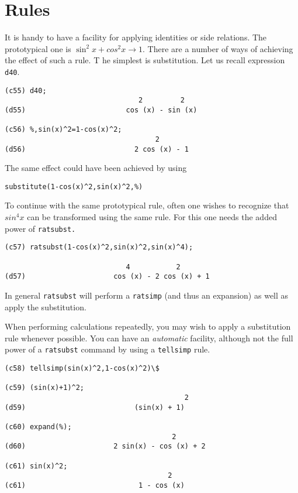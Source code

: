 \section{Rules}

It is handy to have a facility for applying identities or side relations.
The prototypical one is $ \sin^2 x + cos^2 x  \rightarrow 1 $.
There are a number of ways of achieving the effect of such a rule.  T
he simplest is substitution.  Let us recall expression {\tt d40}.
\begin{verbatim}
(c55) d40;
                                2         2
(d55)                        cos (x) - sin (x)

(c56) %,sin(x)^2=1-cos(x)^2;
                                    2
(d56)                          2 cos (x) - 1
\end{verbatim}
        The same effect could have been achieved by using
\begin{center}
\begin{verbatim}
substitute(1-cos(x)^2,sin(x)^2,%)
\end{verbatim}
\end{center}

To continue with the same prototypical rule,
often one wishes to recognize that $sin^4 x $ can be
transformed using the same rule.  For this one needs the
added power of 
{\tt ratsubst.}
\begin{verbatim}
(c57) ratsubst(1-cos(x)^2,sin(x)^2,sin(x)^4);

                             4           2
(d57)                     cos (x) - 2 cos (x) + 1
\end{verbatim}

In general {\tt ratsubst}
will perform a {\tt ratsimp}
(and thus an expansion) as well as apply the substitution.

When performing calculations repeatedly, you may wish
to apply a substitution rule whenever possible.  You can have an
{\it automatic} facility, although not the full power of a
{\tt ratsubst}
command by using a {\tt tellsimp}
rule.
\begin{verbatim}
(c58) tellsimp(sin(x)^2,1-cos(x)^2)\$

(c59) (sin(x)+1)^2;
                                           2
(d59)                          (sin(x) + 1)

(c60) expand(%);
                                        2
(d60)                     2 sin(x) - cos (x) + 2

(c61) sin(x)^2;
                                       2
(c61)                           1 - cos (x)
\end{verbatim}

